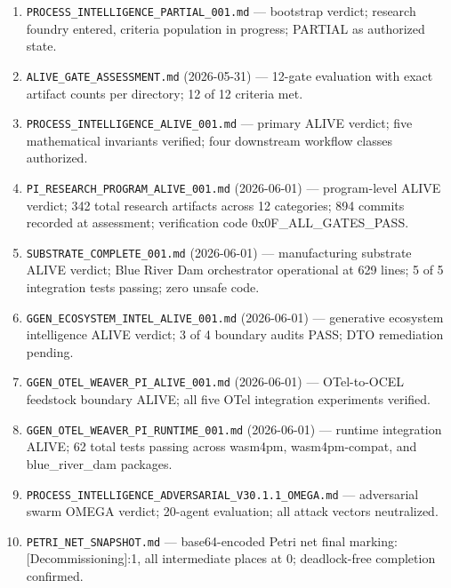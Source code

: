 \begin{enumerate}
  \item \texttt{PROCESS\_INTELLIGENCE\_PARTIAL\_001.md} --- bootstrap verdict; research foundry entered,
        criteria population in progress; PARTIAL as authorized state.
  \item \texttt{ALIVE\_GATE\_ASSESSMENT.md} (2026-05-31) --- 12-gate evaluation with exact artifact
        counts per directory; 12 of 12 criteria met.
  \item \texttt{PROCESS\_INTELLIGENCE\_ALIVE\_001.md} --- primary ALIVE verdict; five mathematical
        invariants verified; four downstream workflow classes authorized.
  \item \texttt{PI\_RESEARCH\_PROGRAM\_ALIVE\_001.md} (2026-06-01) --- program-level ALIVE verdict;
        342 total research artifacts across 12 categories; 894 commits recorded at assessment;
        verification code 0x0F\_ALL\_GATES\_PASS.
  \item \texttt{SUBSTRATE\_COMPLETE\_001.md} (2026-06-01) --- manufacturing substrate ALIVE verdict;
        Blue River Dam orchestrator operational at 629 lines; 5 of 5 integration tests passing;
        zero unsafe code.
  \item \texttt{GGEN\_ECOSYSTEM\_INTEL\_ALIVE\_001.md} (2026-06-01) --- generative ecosystem
        intelligence ALIVE verdict; 3 of 4 boundary audits PASS; DTO remediation pending.
  \item \texttt{GGEN\_OTEL\_WEAVER\_PI\_ALIVE\_001.md} (2026-06-01) --- OTel-to-OCEL feedstock
        boundary ALIVE; all five OTel integration experiments verified.
  \item \texttt{GGEN\_OTEL\_WEAVER\_PI\_RUNTIME\_001.md} (2026-06-01) --- runtime integration
        ALIVE; 62 total tests passing across wasm4pm, wasm4pm-compat, and blue\_river\_dam packages.
  \item \texttt{PROCESS\_INTELLIGENCE\_ADVERSARIAL\_V30.1.1\_OMEGA.md} --- adversarial swarm
        OMEGA verdict; 20-agent evaluation; all attack vectors neutralized.
  \item \texttt{PETRI\_NET\_SNAPSHOT.md} --- base64-encoded Petri net final marking:
        [Decommissioning]:1, all intermediate places at 0; deadlock-free completion confirmed.
\end{enumerate}
